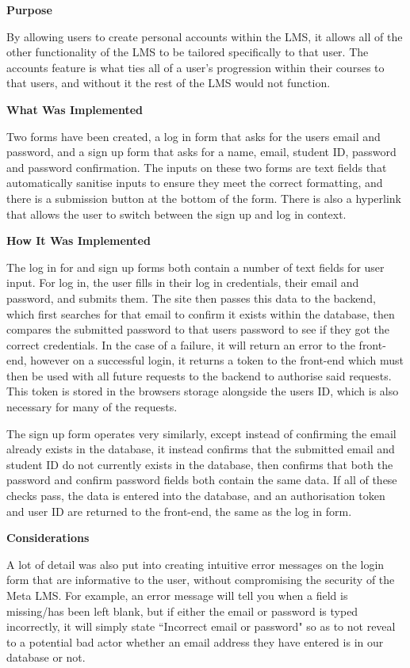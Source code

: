 \textbf{Purpose}

By allowing users to create personal accounts within the LMS, it allows all of the other functionality of the LMS to be tailored specifically to that user. The accounts feature is what ties all of a user's progression within their courses to that users, and without it the rest of the LMS would not function.

\textbf{What Was Implemented}

Two forms have been created, a log in form that asks for the users email and password, and a sign up form that asks for a name, email, student ID, password and password confirmation. The inputs on these two forms are text fields that automatically sanitise inputs to ensure they meet the correct formatting, and there is a submission button at the bottom of the form. There is also a hyperlink that allows the user to switch between the sign up and log in context.

\textbf{How It Was Implemented}

The log in for and sign up forms both contain a number of text fields for user input. For log in, the user fills in their log in credentials, their email and password, and submits them. The site then passes this data to the backend, which first searches for that email to confirm it exists within the database, then compares the submitted password to that users password to see if they got the correct credentials. In the case of a failure, it will return an error to the front-end, however on a successful login, it returns a token to the front-end which must then be used with all future requests to the backend to authorise said requests. This token is stored in the browsers storage alongside the users ID, which is also necessary for many of the requests.

The sign up form operates very similarly, except instead of confirming the email already exists in the database, it instead confirms that the submitted email and student ID do not currently exists in the database, then confirms that both the password and confirm password fields both contain the same data. If all of these checks pass, the data is entered into the database, and an authorisation token and user ID are returned to the front-end, the same as the log in form. 

\textbf{Considerations}

A lot of detail was also put into creating intuitive error messages on the login form that are informative to the user, without compromising the security of the Meta LMS. For example, an error message will tell you when a field is missing/has been left blank, but if either the email or password is typed incorrectly, it will simply state ``Incorrect email or password" so as to not reveal to a potential bad actor whether an email address they have entered is in our database or not.

